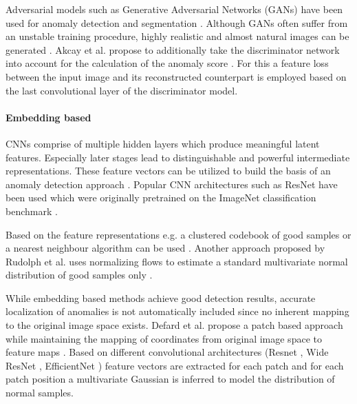 \documentclass[final,5p,times,twocolumn]{elsarticle}
\begin{document}
	Adversarial models such as Generative Adversarial Networks (GANs) have been used for anomaly detection and segmentation \cite{MvtecAd2019,schlegl2017unsupervised, akcay2018ganomaly,akcay2019skipganomaly}.
	Although GANs often suffer from an unstable training procedure, highly realistic and almost natural images can be generated \cite{Goodfellow-et-al-2016, gans2014}.
	Akcay et al. propose to additionally take the discriminator network into account for the calculation of the anomaly score \cite{akcay2019skipganomaly}.
	For this a feature loss between the input image and its reconstructed counterpart is employed based on the last convolutional layer of the discriminator model.
	
	
	
	\paragraph{Embedding based}
	CNNs comprise of multiple hidden layers which produce meaningful latent features.
	Especially later stages lead to distinguishable and powerful intermediate representations.
	These feature vectors can be utilized to build the basis of an anomaly detection approach \cite{ruff2018deeponeclass, bergman2020deep, defard2020padim, rudolph2020differnet}.
	Popular CNN architectures such as ResNet have been used which were originally pretrained on the ImageNet classification benchmark \cite{he2015deep, Deng2009Imagenet, Napoletano2018cnnembedding}.
	
	Based on the feature representations e.g. a clustered codebook of good samples \cite{Napoletano2018cnnembedding} or a nearest neighbour algorithm can be used \cite{ruff2018deeponeclass,bergman2020deep}.
	Another approach proposed by Rudolph et al. uses normalizing flows to estimate a standard multivariate normal distribution of good samples only \cite{rudolph2020differnet}.
	
	While embedding based methods achieve good detection results, accurate localization of anomalies is not automatically included since no inherent mapping to the original image space exists.
	Defard et al. propose a patch based approach while maintaining the mapping of coordinates from original image space to feature maps \cite{defard2020padim}.
	Based on different convolutional architectures (Resnet  \cite{he2015deep}, Wide ResNet \cite{zagoruyko2017wide}, EfficientNet \cite{tan2020efficientnet}) feature vectors are  extracted for each patch and for each patch position a multivariate Gaussian is inferred to model the distribution of normal samples.
	
\end{document}
